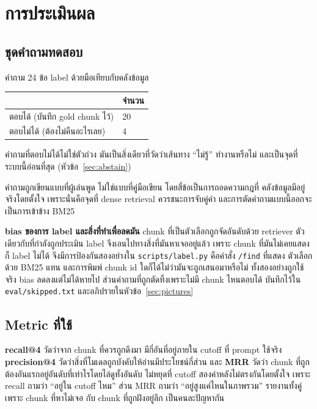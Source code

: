 \documentclass[11pt,a4paper]{article}
\newcommand{\thead}[1]{\textbf{#1}}
\newcommand{\code}[1]{\texttt{\small #1}}
\begin{document}
\section{การประเมินผล}

\subsection{ชุดคำถามทดสอบ}
\label{sec:testset}

คำถาม 24 ข้อ label ด้วยมือเทียบกับคลังข้อมูล

\begin{table}[H]
\centering
\small
\begin{tabular}{@{}L{9cm} C{2.4cm}@{}}
\toprule
\thead{} & \thead{จำนวน} \\
\midrule
ตอบได้ (บันทึก gold chunk ไว้) & 20 \\
ตอบไม่ได้ (ต้องไม่คืนอะไรเลย) & 4 \\
\bottomrule
\end{tabular}
\end{table}

คำถามที่ตอบไม่ได้ไม่ใช่ตัวถ่วง มันเป็นสิ่งเดียวที่วัดว่าเส้นทาง “ไม่รู้” ทำงานหรือไม่
และเป็นจุดที่ระบบนี้อ่อนที่สุด (หัวข้อ~\ref{sec:abstain})

คำถามถูกเขียนแบบที่ผู้เล่นพูด ไม่ใช่แบบที่คู่มือเขียน โดยสี่ข้อเป็นการถอดความกฎที่
คลังข้อมูลมีอยู่จริงโดยตั้งใจ เพราะนั่นคือจุดที่ dense retrieval ควรชนะการจับคู่คำ
และการตัดคำถามแบบนี้ออกจะเป็นการเข้าข้าง BM25

\textbf{bias ของการ label และสิ่งที่ทำเพื่อลดมัน}\quad
chunk ที่เป็นตัวเลือกถูกจัดอันดับด้วย retriever ตัวเดียวกับที่กำลังถูกประเมิน
label จึงเอนไปทางสิ่งที่มันหาเจออยู่แล้ว เพราะ chunk ที่มันไม่เคยแสดงก็ label ไม่ได้
จึงมีการป้องกันสองอย่างใน \code{scripts/label.py} คือคำสั่ง \code{/find} ที่แสดง
ตัวเลือกด้วย BM25 แทน และการพิมพ์ chunk id ใดก็ได้ไม่ว่ามันจะถูกเสนอมาหรือไม่
ทั้งสองอย่างถูกใช้จริง bias ลดลงแต่ไม่ได้หายไป ส่วนคำถามที่ถูกตัดทิ้งเพราะไม่มี chunk
ไหนตอบได้ บันทึกไว้ใน \code{eval/skipped.txt} และอภิปรายในหัวข้อ~\ref{sec:pictures}

\subsection{Metric ที่ใช้}

\textbf{recall@4} วัดว่าจาก chunk ที่ควรถูกดึงมา มีกี่อันที่อยู่ภายใน cutoff ที่ prompt
ใช้จริง \textbf{precision@4} วัดว่าสิ่งที่โมเดลถูกบังคับให้อ่านมีประโยชน์กี่ส่วน และ
\textbf{MRR} วัดว่า chunk ที่ถูกต้องอันแรกอยู่อันดับที่เท่าไรโดยไล่ดูทั้งอันดับ ไม่หยุดที่ cutoff
สองค่าหลังไม่ตรงกันโดยตั้งใจ เพราะ recall ถามว่า “อยู่ใน cutoff ไหม” ส่วน MRR ถามว่า
“อยู่สูงแค่ไหนในภาพรวม” รายงานทั้งคู่เพราะ chunk ที่หาไม่เจอ กับ chunk ที่ถูกฝังอยู่ลึก
เป็นคนละปัญหากัน
\end{document}
